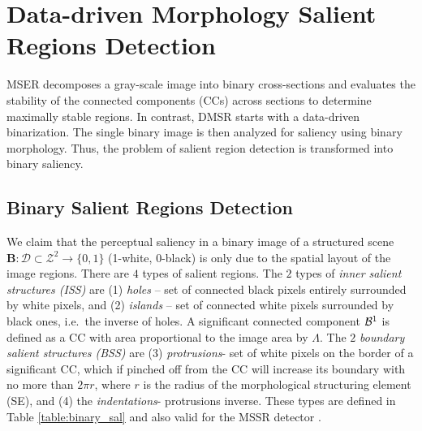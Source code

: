 \documentclass[conference,compsoc]{IEEEtran}
\def\B{{\mathbf B}}
\def\mcD{{\mathcal{D}}}
\begin{document}
\section{Data-driven Morphology Salient Regions Detection}
\label{sec:DMSR}


MSER decomposes a gray-scale image into binary cross-sections and evaluates the stability of the connected components (CCs) across sections to determine maximally stable regions. In contrast, DMSR starts with a data-driven binarization. The single binary image is then analyzed for saliency using binary morphology. Thus, the problem of salient region detection is transformed into binary saliency.

\subsection{Binary Salient Regions Detection}
\label{ssec:binary}
We claim that the perceptual saliency in a binary image of a structured scene 
 $\B: \mcD \subset \mathcal{Z}^2 \rightarrow \{0,1\}$ (1-white, 0-black)
is only due to the spatial layout of the image regions. 
There are  $4$ types of salient regions. The $2$ types of {\em inner salient structures (ISS)} are (1) {\em holes} -- set of connected black pixels entirely surrounded by white pixels, and (2) {\em islands} -- set of connected white pixels surrounded by black ones, i.e.~the inverse of holes. A significant connected component ${\cal B}^1$ is defined as a CC with area proportional to the image area by $\Lambda$.  
The $2$ {\em boundary salient structures (BSS)} are (3) {\em protrusions}- set of white pixels on the border of a significant CC, which if pinched off from the CC will increase its boundary with no more than $2\pi r$, where $r$ is the radius of the morphological structuring element (SE), and (4) the {\em indentations}- protrusions inverse. These types are defined in Table \ref{table:binary_sal} and also valid for the MSSR detector \cite{RangHumpb06}. 
\end{document}
